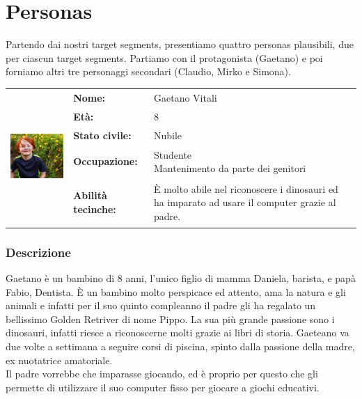 \documentclass[../Report.tex]{subfiles}
\begin{document}
    \section{Personas}
    Partendo dai nostri target segments, presentiamo quattro personas plausibili, due per ciascun target segments. Partiamo con il protagonista (Gaetano) e poi forniamo altri tre personaggi secondari (Claudio, Mirko e Simona).\\

    \begin{table}[H]
        \begin{tabular}{|c|l|p{7cm}|}
            \hline
            \multirow{5}{*}{\includegraphics[width=5cm, height=5cm]{Gaetano.jpg}} 
                & \textbf{Nome:} & Gaetano Vitali\\ \cmidrule{2-3}
            & \textbf{Età:} & 8 \\ \cmidrule{2-3}
            & \textbf{Stato civile:} & Nubile \\ \cmidrule{2-3}
            & \textbf{Occupazione:} & \makecell{Studente \\ Mantenimento da parte dei genitori} \\ \cmidrule{2-3}
            & \textbf{Abilità tecinche:} &  È molto abile nel riconoscere i dinosauri ed ha imparato ad usare il computer grazie al padre.\\
            \hline
        \end{tabular}
    \end{table}

    \subsubsection{Descrizione}
    Gaetano è un bambino di 8 anni, l'unico figlio di mamma Daniela, barista, e papà Fabio, Dentista. È un bambino molto perspicace ed attento, ama la natura e gli animali e infatti per il suo quinto compleanno il padre gli ha regalato un bellissimo Golden Retriver di nome Pippo. La sua più grande passione sono i dinosauri, infatti riesce a riconoscerne molti grazie ai libri di storia.
    Gaeteano va due volte a settimana a seguire corsi di piscina, spinto dalla passione della madre, ex nuotatrice amatoriale.\\
    Il padre vorrebbe che imparasse giocando, ed è proprio per questo che gli permette di utilizzare il suo computer fisso per giocare a giochi educativi.
\end{document}
